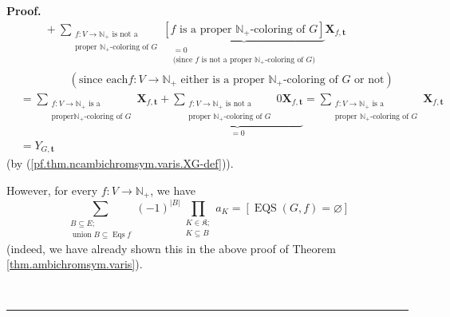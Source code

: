 \documentclass[numbers=enddot,12pt,final,onecolumn,notitlepage]{scrartcl}%
\theoremstyle{definition}
\newenvironment{proof}[1][Proof]{\noindent\textbf{#1.} }{\ \rule{0.5em}{0.5em}}
\newenvironment{verlong}{}{}
\let\sumnonlimits\sum
\let\prodnonlimits\prod
\renewcommand{\sum}{\sumnonlimits\limits}
\renewcommand{\prod}{\prodnonlimits\limits}
\begin{document}
\begin{verlong}
\begin{proof}
\begin{align}
&  \ \ \ \ \ \ \ \ \ \ +\sum_{\substack{f:V\rightarrow\mathbb{N}_{+}\text{ is
not a}\\\text{proper }\mathbb{N}_{+}\text{-coloring of }G}}\underbrace{\left[
f\text{ is a proper }\mathbb{N}_{+}\text{-coloring of }G\right]
}_{\substack{=0\\\text{(since }f\text{ is not a proper }\mathbb{N}%
_{+}\text{-coloring of }G\text{)}}}\mathbf{X}_{f,\mathbf{t}}\nonumber\\
&  \ \ \ \ \ \ \ \ \ \ \ \ \ \ \ \ \ \ \ \ \left(  \text{since each
}f:V\rightarrow\mathbb{N}_{+}\text{ either is a proper }\mathbb{N}%
_{+}\text{-coloring of }G\text{ or not}\right) \nonumber\\
&  =\sum_{\substack{f:V\rightarrow\mathbb{N}_{+}\text{ is a}\\\text{proper
}\mathbb{N}_{+}\text{-coloring of }G}}\mathbf{X}_{f,\mathbf{t}}%
+\underbrace{\sum_{\substack{f:V\rightarrow\mathbb{N}_{+}\text{ is not
a}\\\text{proper }\mathbb{N}_{+}\text{-coloring of }G}}0\mathbf{X}%
_{f,\mathbf{t}}}_{=0}=\sum_{\substack{f:V\rightarrow\mathbb{N}_{+}\text{ is
a}\\\text{proper }\mathbb{N}_{+}\text{-coloring of }G}}\mathbf{X}%
_{f,\mathbf{t}}\nonumber\\
&  =Y_{G,\mathbf{t}} \label{pf.thm.ncambichromsym.varis.step1}%
\end{align}
(by (\ref{pf.thm.ncambichromsym.varis.XG-def})).

However, for every $f:V\rightarrow\mathbb{N}_{+}$, we have%
\begin{equation}
\sum_{\substack{B\subseteq E;\\\operatorname*{union}B\subseteq
\operatorname*{Eqs}f}}\left(  -1\right)  ^{\left\vert B\right\vert }%
\prod_{\substack{K\in\mathfrak{K};\\K\subseteq B}}a_{K}=\left[
\operatorname*{EQS}\left(  G,f\right)  =\varnothing\right]
\label{pf.thm.ncambichromsym.varis.moeb2}%
\end{equation}
(indeed, we have already shown this in the above proof of Theorem
\ref{thm.ambichromsym.varis}).


\end{proof}
\end{verlong}
\end{document}
